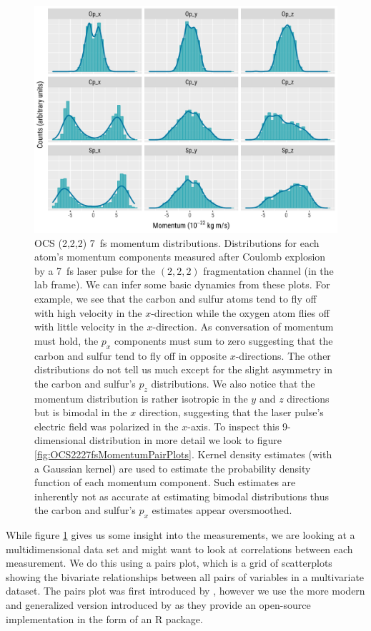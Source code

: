 \begin{figure}
  \centering
  \includegraphics[width=\textwidth]{Plots/OCS2227fsMomentum}
  \caption[OCS (2,2,2) 7fs momentum distributions.]
  {OCS (2,2,2) \SI{7}{\fs} momentum distributions. Distributions for each atom's momentum components measured after Coulomb explosion by a \SI{7}{\fs} laser pulse for the $(2,2,2)$ fragmentation channel (in the lab frame). We can infer some basic dynamics from these plots. For example, we see that the carbon and sulfur atoms tend to fly off with high velocity in the $x$-direction while the oxygen atom flies off with little velocity in the $x$-direction. As conversation of momentum must hold, the $p_x$ components must sum to zero suggesting that the carbon and sulfur tend to fly off in opposite $x$-directions. The other distributions do not tell us much except for the slight asymmetry in the carbon and sulfur's $p_z$ distributions. We also notice that the momentum distribution is rather isotropic in the $y$ and $z$ directions but is bimodal in the $x$ direction, suggesting that the laser pulse's electric field was polarized in the $x$-axis. To inspect this 9-dimensional distribution in more detail we look to figure \ref{fig:OCS2227fsMomentumPairPlots}. Kernel density estimates (with a Gaussian kernel) are used to estimate the probability density function of each momentum component. Such estimates are inherently not as accurate at estimating bimodal distributions thus the carbon and sulfur's $p_x$ estimates appear oversmoothed.}
  \label{fig:OCS2227fsMomentum}
\end{figure}

While figure \ref{fig:OCS2227fsMomentum} gives us some insight into the measurements, we are looking at a multidimensional data set and might want to look at correlations between each measurement. We do this using a pairs plot, which is a grid of scatterplots showing the bivariate relationships between all pairs of variables in a multivariate dataset. The pairs plot was first introduced by \citet{Hartigan75}, however we use the more modern and generalized version introduced by \citet{Emerson13} as they provide an open-source implementation in the form of an R package.

